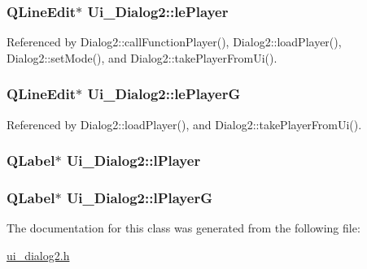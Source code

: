 \subsubsection[{le\+Player}]{\setlength{\rightskip}{0pt plus 5cm}Q\+Line\+Edit$\ast$ Ui\+\_\+\+Dialog2\+::le\+Player}\label{class_ui___dialog2_ad162dcfb64716385a50954e495e7c49d}


Referenced by Dialog2\+::call\+Function\+Player(), Dialog2\+::load\+Player(), Dialog2\+::set\+Mode(), and Dialog2\+::take\+Player\+From\+Ui().

\hypertarget{class_ui___dialog2_a43afbca4fe8ee4a670b656404bc2f48e}{}
\subsubsection[{le\+Player\+G}]{\setlength{\rightskip}{0pt plus 5cm}Q\+Line\+Edit$\ast$ Ui\+\_\+\+Dialog2\+::le\+Player\+G}\label{class_ui___dialog2_a43afbca4fe8ee4a670b656404bc2f48e}


Referenced by Dialog2\+::load\+Player(), and Dialog2\+::take\+Player\+From\+Ui().

\hypertarget{class_ui___dialog2_ae1ec14f69f0c7973147839a3111995d4}{}
\subsubsection[{l\+Player}]{\setlength{\rightskip}{0pt plus 5cm}Q\+Label$\ast$ Ui\+\_\+\+Dialog2\+::l\+Player}\label{class_ui___dialog2_ae1ec14f69f0c7973147839a3111995d4}
\hypertarget{class_ui___dialog2_a82819233e3af6d903c4d2599dd29b83f}{}
\subsubsection[{l\+Player\+G}]{\setlength{\rightskip}{0pt plus 5cm}Q\+Label$\ast$ Ui\+\_\+\+Dialog2\+::l\+Player\+G}\label{class_ui___dialog2_a82819233e3af6d903c4d2599dd29b83f}


The documentation for this class was generated from the following file\+:\begin{DoxyCompactItemize}
\item 
\hyperlink{ui__dialog2_8h}{ui\+\_\+dialog2.\+h}\end{DoxyCompactItemize}
